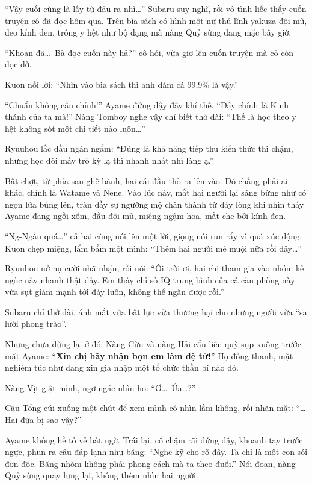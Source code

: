 \documentclass[../main.tex]{subfiles}
\begin{document}
``Vậy cuối cùng là lấy từ đâu ra nhỉ\dots'' Subaru suy nghĩ, rồi vô tình liếc thấy cuốn truyện cô đã đọc hôm qua. Trên bìa sách có hình một nữ thủ lĩnh yakuza đội mũ, đeo kính đen, trông y hệt như bộ dạng mà nàng Quỷ sừng đang mặc bây giờ.

``Khoan đã\dots\ Bà đọc cuốn này hả?'' cô hỏi, vừa giơ lên cuốn truyện mà cô còn đọc dở.

Kuon nối lời: ``Nhìn vào bìa sách thì anh dám cá 99,9\% là vậy.''

``Chuẩn không cần chỉnh!'' Ayame đứng dậy đầy khí thế. ``Đây chính là Kinh thánh của ta mà!'' Nàng Tomboy nghe vậy chỉ biết thở dài: ``Thế là học theo y hệt không sót một chi tiết nào luôn\dots''

Ryuuhou lắc đầu ngán ngẩm: ``Đúng là khả năng tiếp thu kiến thức thì chậm, nhưng học đòi mấy trò kỳ lạ thì nhanh nhất nhì làng ạ.''

Bất chợt, từ phía sau ghế bành, hai cái đầu thò ra lẻn vào. Đó chẳng phải ai khác, chính là Watame và Nene. Vào lúc này, mắt hai người lại sáng bừng như có ngọn lửa bùng lên, tràn đầy sự ngưỡng mộ chân thành từ đáy lòng khi nhìn thấy Ayame đang ngồi xổm, đầu đội mũ, miệng ngậm hoa, mắt che bởi kính đen.


``Ng-Ngầu quá\dots'' cả hai cùng nói lên một lời, giọng nói run rẩy vì quá xúc động. Kuon chẹp miệng, lẩm bẩm một mình: ``Thêm hai người mê muội nữa rồi đây\dots''

Ryuuhou nở nụ cười nhã nhặn, rồi nói: ``Ôi trời ơi, hai chị tham gia vào nhóm kẻ ngốc này nhanh thật đấy. Em thấy chỉ số IQ trung bình của cả căn phòng này vừa sụt giảm mạnh tới đáy luôn, không thể ngăn được rồi.''

Subaru chỉ thở dài, ánh mắt vừa bất lực vừa thương hại cho những người vừa ``sa lưới phong trào''.

Nhưng chưa dừng lại ở đó. Nàng Cừu và nàng Hải cẩu liền quỳ sụp xuống trước mặt Ayame: ``\textbf{Xin chị hãy nhận bọn em làm đệ tử!}'' Họ đồng thanh, mặt nghiêm túc như đang xin gia nhập một tổ chức thần bí nào đó.

Nàng Vịt giật mình, ngơ ngác nhìn họ: ``Ơ\dots\ Ủa\dots?''

Cậu Tổng cúi xuống một chút để xem mình có nhìn lầm không, rồi nhăn mặt: ``\dots Hai đứa bị sao vậy?''

Ayame không hề tỏ vẻ bất ngờ. Trái lại, cô chậm rãi đứng dậy, khoanh tay trước ngực, phun ra câu đáp lạnh như băng: ``Nghe kỹ cho rõ đây. Ta chỉ là một con sói đơn độc. Băng nhóm không phải phong cách mà ta theo đuổi.'' Nói đoạn, nàng Quỷ sừng quay lưng lại, không thèm nhìn hai người.
\end{document}
